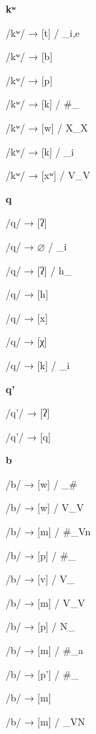 \begin{center}\textbf{kʷ}\end{center}
\begin{multicols}{4}
\noindent /kʷ/ → [t] / \_{i,e}

\noindent /kʷ/ → [b]

\noindent /kʷ/ → [p]

\noindent /kʷ/ → [k] / \#\_

\noindent /kʷ/ → [w] / X\_X

\noindent /kʷ/ → [k] / \_i

\noindent /kʷ/ → [xʷ] / V\_V

\end{multicols}

\begin{center}\textbf{q}\end{center}
\begin{multicols}{4}
\noindent /q/ → [ʔ]

\noindent /q/ → $\varnothing$ / \_i

\noindent /q/ → [ʔ] / h\_

\noindent /q/ → [h]

\noindent /q/ → [x]

\noindent /q/ → [χ]

\noindent /q/ → [k] / \_i

\end{multicols}

\begin{center}\textbf{q'}\end{center}
\begin{multicols}{4}
\noindent /q'/ → [ʔ]

\noindent /q'/ → [q]

\end{multicols}

\begin{center}\textbf{b}\end{center}
\begin{multicols}{4}
\noindent /b/ → [w] / \_\#

\noindent /b/ → [w] / V\_V

\noindent /b/ → [m] / \#\_Vn

\noindent /b/ → [p] / \#\_

\noindent /b/ → [v] / V\_

\noindent /b/ → [m] / V\_V

\noindent /b/ → [p] / N\_

\noindent /b/ → [m] / \#\_a

\noindent /b/ → [p'] / \#\_

\noindent /b/ → [m]

\noindent /b/ → [m] / \_VN

\end{multicols}

